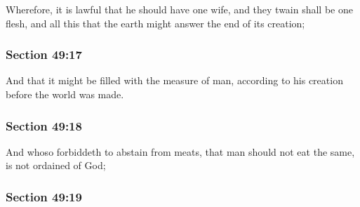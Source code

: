 		Wherefore, it is lawful that he should have one wife, and they twain shall be one flesh, and all this that the earth might answer the end of its creation;


	\subsubsection{Section 49:17} %
		\label{DC49-17}

		And that it might be filled with the measure of man, according to his creation before the world was made.


	\subsubsection{Section 49:18} %
		\label{DC49-18}

		And whoso forbiddeth to abstain from meats, that man should not eat the same, is not ordained of God;


	\subsubsection{Section 49:19} %
		\label{DC49-19}

